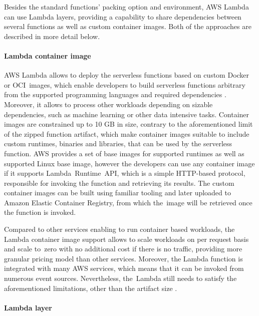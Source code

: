 Besides the standard functions' packing option and environment, AWS Lambda can use Lambda layers, providing a capability to share dependencies between several functions as well as custom container images.
Both of the approaches are described in more detail below.

\paragraph{Lambda container image}

AWS Lambda allows to deploy the serverless functions based on custom Docker or OCI~images, which enable developers to build serverless functions arbitrary from the supported programming languages and required dependencies \cite{AWSLambdaContainerImage}. Moreover, it allows to process other workloads depending on sizable dependencies, such as machine learning or other data intensive tasks.
Container images are constrained up to 10 GB in size, contrary to the aforementioned limit of the zipped function artifact, which make container images suitable to include custom runtimes, binaries and libraries, that can be used by the serverless function.
AWS provides a set of base images for supported runtimes as well as supported Linux base image, however the developers can use any container image if it supports Lambda~Runtime~API, which is a simple HTTP-based protocol, responsible for invoking the function and retrieving its results.
The custom container images can be built using familiar tooling and later uploaded to Amazon Elastic Container Registry, from which the~image will be retrieved once the function is invoked.

Compared to other services enabling to run container based workloads, the Lambda container image support allows to scale workloads on per request basis and scale to~zero with no additional cost if there is no traffic, providing more granular pricing model than other services. Moreover, the Lambda function is integrated with many AWS services, which means that it can be invoked from numerous event sources. 
Nevertheless, the~Lambda still needs to satisfy the aforementioned limitations, other than the artifact size \cite{RunningContainerImagesInAWSLambda}.

\paragraph{Lambda layer}

